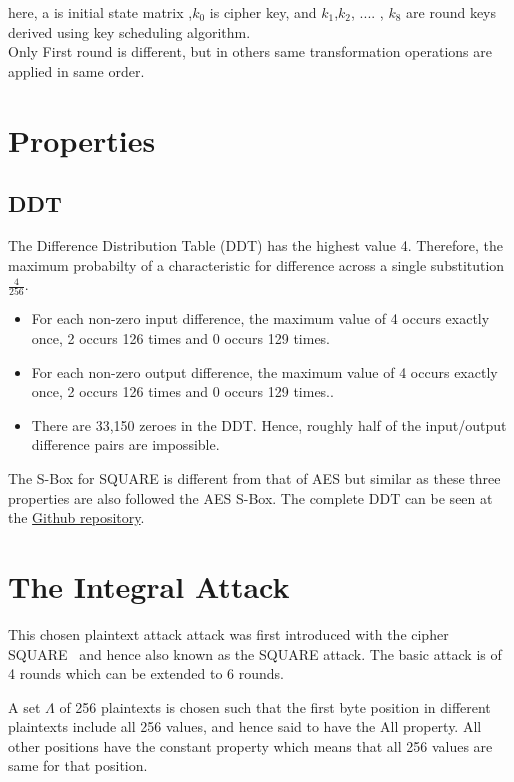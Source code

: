 \documentclass[preprint]{transcrypto}
\begin{document}
here, a is initial state matrix ,$k_{0}$ is cipher key, and $k_{1}$,$k_{2}$, .... , $k_{8}$ are round keys derived using key scheduling algorithm.\\
Only First round is different, but in others same transformation operations are applied in same order.


\section{Properties}
\subsection{DDT}
The Difference Distribution Table (DDT) has the highest value 4. Therefore, the maximum probabilty of a characteristic for difference across a single substitution $\frac{4}{256}$.

\begin{itemize}
  \item For each non-zero input difference, the maximum value of 4 occurs exactly once, 2 occurs 126 times and 0 occurs 129 times.
  \item For each non-zero output difference, the maximum value of 4 occurs exactly once, 2 occurs 126 times and 0 occurs 129 times..
  \item There are 33,150 zeroes in the DDT. Hence, roughly half of the input/output difference pairs are impossible.
\end{itemize}

The S-Box for SQUARE is different from that of AES but similar as these three properties are also followed the AES S-Box. The complete DDT can be seen at the \href{https://github.com/supercoww/square-term-paper/blob/master/code/scripts/ddt.txt}{Github repository}.

\section{The Integral Attack}
This chosen plaintext attack attack was first introduced with the cipher SQUARE~\cite{FSE:DaeKnuRij97} and hence also known as the SQUARE attack. The basic attack is of 4 rounds which can be extended to 6 rounds.

A set $\Lambda$ of 256 plaintexts is chosen such that the first byte position in different plaintexts include all 256 values, and hence said to have the All property. All other positions have the constant property which means that all 256 values are same for that position.
\end{document}
